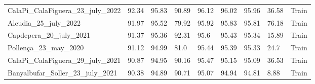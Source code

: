 \begin{table}[H]
{\begin{tabular}{lllllllll}
            CalaPi\_CalaFiguera\_23\_july\_2022    & 92.34               &
            95.83
                                                   & 90.89               &
            96.12
                                                   & 96.02               &
            95.96
                                                   & 36.58               &
            {\color[HTML]{66c2a5} Train}
            \\
            Alcudia\_25\_july\_2022                & 91.97               &
            95.52
                                                   & 79.92               &
            95.92
                                                   & 95.83               &
            95.81
                                                   & 76.18               &
            {\color[HTML]{66c2a5} Train}
            \\
            Capdepera\_20\_july\_2021              & 91.37               &
            95.36
                                                   & 92.31               & 95.6
                                                   & 95.43               &
            95.34
                                                   & 15.89               &
            {\color[HTML]{66c2a5} Train}
            \\
            Pollença\_23\_may\_2020                & 91.12               &
            94.99
                                                   & 81.0                &
            95.44
                                                   & 95.39               &
            95.33
                                                   & 24.7                &
            {\color[HTML]{66c2a5} Train}
            \\
            CalaPi\_CalaFiguera\_29\_july\_2021    & 90.87               &
            94.95
                                                   & 90.16               &
            95.47
                                                   & 95.15               &
            95.09
                                                   & 36.53               &
            {\color[HTML]{66c2a5} Train}
            \\
            Banyalbufar\_Soller\_23\_july\_2021    & 90.38               &
            94.89
                                                   & 90.71               &
            95.07
                                                   & 94.94               &
            94.81
                                                   & 8.88                &
            {\color[HTML]{66c2a5} Train}

\end{tabular}}
\end{table}
